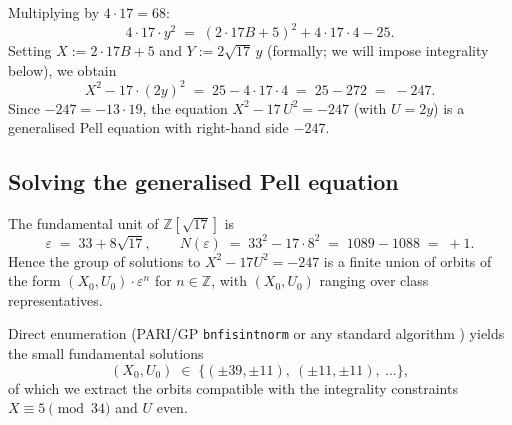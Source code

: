 \documentclass[11pt,a4paper]{article}
\theoremstyle{plain}
\theoremstyle{definition}
\newcommand{\Z}{\mathbb{Z}}
\begin{document}
Multiplying by $4 \cdot 17 = 68$:
\begin{equation*}
  4 \cdot 17 \cdot y^2 \;=\; (2 \cdot 17 B + 5)^2 + 4 \cdot 17 \cdot 4 - 25.
\end{equation*}
Setting $X := 2 \cdot 17 B + 5$ and $Y := 2 \sqrt{17}\, y$ (formally;
we will impose integrality below), we obtain
\begin{equation}
  \label{eq:pell-reduced}
  X^2 - 17 \cdot (2y)^2 \;=\; 25 - 4 \cdot 17 \cdot 4 \;=\; 25 - 272 \;=\; -247.
\end{equation}
Since $-247 = -13 \cdot 19$, the equation $X^2 - 17 \, U^2 = -247$
(with $U = 2y$) is a generalised Pell equation with right-hand side
$-247$.

\subsection{Solving the generalised Pell equation}

The fundamental unit of $\Z[\sqrt{17}]$ is
\begin{equation*}
  \varepsilon \;=\; 33 + 8\sqrt{17},
  \qquad N(\varepsilon) \;=\; 33^2 - 17 \cdot 8^2 \;=\; 1089 - 1088 \;=\; +1.
\end{equation*}
Hence the group of solutions to $X^2 - 17 U^2 = -247$ is a finite
union of orbits of the form
$(X_0, U_0) \cdot \varepsilon^{n}$ for $n \in \Z$,
with $(X_0, U_0)$ ranging over class representatives.

Direct enumeration (PARI/GP \verb|bnfisintnorm| or any standard
algorithm \cite{Mollin1996}) yields the small fundamental solutions
\begin{equation*}
  (X_0, U_0) \;\in\; \{(\pm 39, \pm 11),\ (\pm 11, \pm 11),\ \ldots\},
\end{equation*}
of which we extract the orbits compatible with the integrality
constraints $X \equiv 5 \pmod{34}$ and $U$ even.
\end{document}
